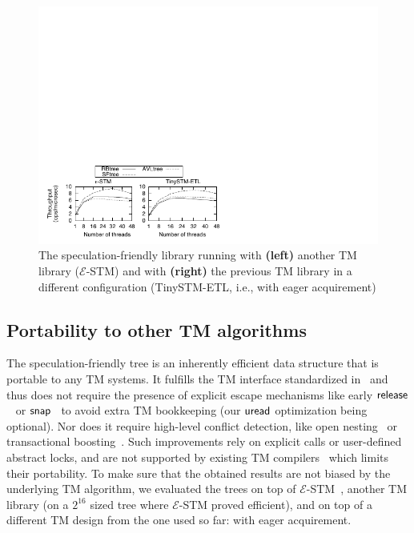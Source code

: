 \begin{figure}
	\begin{center}
	\includegraphics[scale=1.8,clip=true,viewport=0 0 200 83]{Tree/fig/microbench/microbench_avg_4096_u10_estm}
	\caption{The speculation-friendly library running with {\bf (left)} another TM library (${\mathcal E}$-STM) and with {\bf (right)} the previous TM library in a different configuration (TinySTM-ETL, i.e., with eager acquirement)\label{fig:estm}} 
	\end{center}
\end{figure}

\subsection{Portability to other TM algorithms}\label{ssec:othertms}

The speculation-friendly tree is an inherently efficient data structure that is portable to any TM systems.
It fulfills the TM interface standardized in~\cite{abi} and thus does not require the presence of explicit
escape mechanisms like early $\lit{release}$~\cite{HLMS03} or $\lit{snap}$~\cite{CH05} to avoid extra TM bookkeeping 
(our $\act{uread}$ optimization being optional).
Nor does it require high-level conflict detection, like open nesting~\cite{Mos06,NMA+07,ALS09} or transactional boosting~\cite{HK08}. Such improvements rely on 
explicit calls or user-defined abstract locks, and are not supported by existing TM compilers~\cite{abi} which limits their portability.
%
To make sure that the obtained results are not biased by the underlying TM algorithm,
we evaluated the trees on top of ${\mathcal E}$-STM~\cite{FGG09}, another TM library (on a $2^{16}$ sized tree where ${\mathcal E}$-STM proved efficient),
and on top of a different TM design from the one used so far: with eager acquirement.

